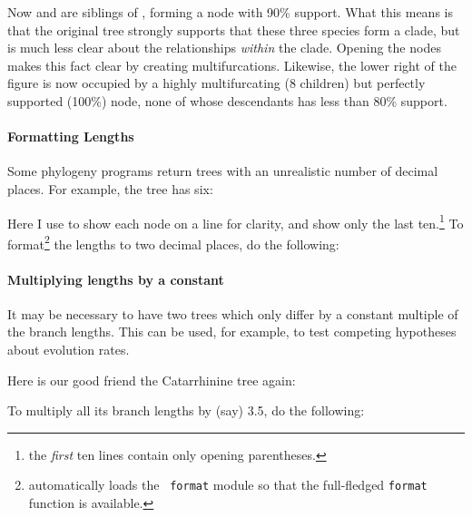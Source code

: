 \startalignment[center]
\externalfigure[ed_4_svg]
\stopalignment

Now  and  are siblings of
, forming a node with 90\% support. What this means is that the
original tree strongly supports that these three species form a clade, but is
much less clear about the relationships {\em within} the clade. Opening the
nodes makes this fact clear by creating multifurcations. Likewise, the lower
right of the figure is now occupied by a highly multifurcating (8 children) but
perfectly supported (100\%) node, none of whose descendants has less than 80\%
support.


\paragraph{Formatting Lengths} 

Some phylogeny programs return \nw{} trees with an unrealistic number
of decimal places. For example, the  tree has six:

\page[no]


Here I use \nwindent{} to show each node on a line for clarity, and
show only the last ten.\footnote{the {\em first} ten lines contain only
opening parentheses.} To format\footnote{\sched{} automatically loads the {\tt
format} module so that the full-fledged {\tt format} function is available.}
the lengths to two decimal places, do the following:

\page[no]


\page[no]
\paragraph{Multiplying lengths by a constant}

It may be necessary to have two trees which only differ by a constant multiple
of the branch lengths. This can be used, for example, to test competing
hypotheses about evolution rates.

Here is our good friend the Catarrhinine tree again:

\startalignment[center]
\externalfigure[ed_8_svg]
\stopalignment

To multiply all its branch lengths by (say) 3.5, do the following:

\startalignment[center]
\externalfigure[ed_12_svg]
\stopalignment

